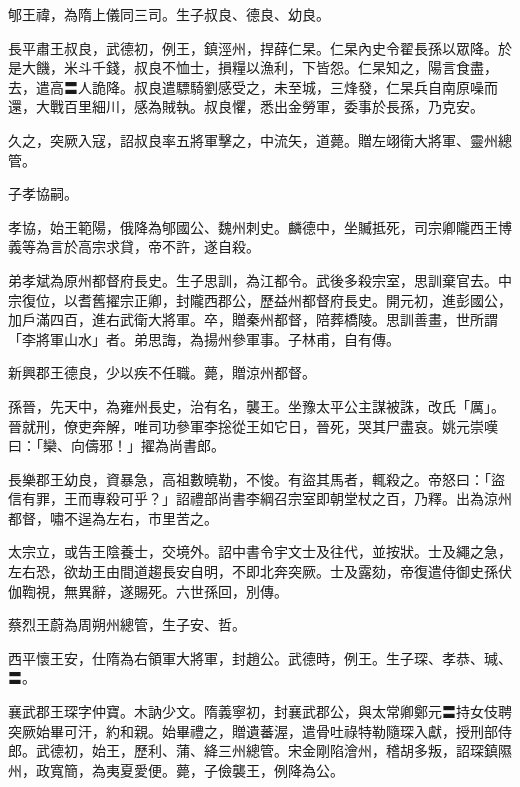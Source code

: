 \begin{pinyinscope}
 郇王禕，為隋上儀同三司。生子叔良、德良、幼良。



 長平肅王叔良，武德初，例王，鎮涇州，捍薛仁杲。仁杲內史令翟長孫以眾降。於是大饑，米斗千錢，叔良不恤士，損糧以漁利，下皆怨。仁杲知之，陽言食盡，去，遣高〓人詭降。叔良遣驃騎劉感受之，未至城，三烽發，仁杲兵自南原噪而還，大戰百里細川，感為賊執。叔良懼，悉出金勞軍，委事於長孫，乃克安。



 久之，突厥入寇，詔叔良率五將軍擊之，中流矢，道薨。贈左翊衛大將軍、靈州總管。



 子孝協嗣。



 孝協，始王範陽，俄降為郇國公、魏州刺史。麟德中，坐贓抵死，司宗卿隴西王博義等為言於高宗求貸，帝不許，遂自殺。



 弟孝斌為原州都督府長史。生子思訓，為江都令。武後多殺宗室，思訓棄官去。中宗復位，以耆舊擢宗正卿，封隴西郡公，歷益州都督府長史。開元初，進彭國公，加戶滿四百，進右武衛大將軍。卒，贈秦州都督，陪葬橋陵。思訓善畫，世所謂「李將軍山水」者。弟思誨，為揚州參軍事。子林甫，自有傳。



 新興郡王德良，少以疾不任職。薨，贈涼州都督。



 孫晉，先天中，為雍州長史，治有名，襲王。坐豫太平公主謀被誅，改氏「厲」。晉就刑，僚吏奔解，唯司功參軍李捴從王如它日，晉死，哭其尸盡哀。姚元崇嘆曰：「欒、向儔邪！」擢為尚書郎。



 長樂郡王幼良，資暴急，高祖數曉勒，不悛。有盜其馬者，輒殺之。帝怒曰：「盜信有罪，王而專殺可乎？」詔禮部尚書李綱召宗室即朝堂杖之百，乃釋。出為涼州都督，嘯不逞為左右，市里苦之。



 太宗立，或告王陰養士，交境外。詔中書令宇文士及往代，並按狀。士及繩之急，左右恐，欲劫王由間道趨長安自明，不即北奔突厥。士及露劾，帝復遣侍御史孫伏伽鞫視，無異辭，遂賜死。六世孫回，別傳。



 蔡烈王蔚為周朔州總管，生子安、哲。



 西平懷王安，仕隋為右領軍大將軍，封趙公。武德時，例王。生子琛、孝恭、瑊、〓。



 襄武郡王琛字仲寶。木訥少文。隋義寧初，封襄武郡公，與太常卿鄭元〓持女伎聘突厥始畢可汗，約和親。始畢禮之，贈遺蕃渥，遣骨吐祿特勒隨琛入獻，授刑部侍郎。武德初，始王，歷利、蒲、絳三州總管。宋金剛陷澮州，稽胡多叛，詔琛鎮隰州，政寬簡，為夷夏愛便。薨，子儉襲王，例降為公。




\end{pinyinscope}
